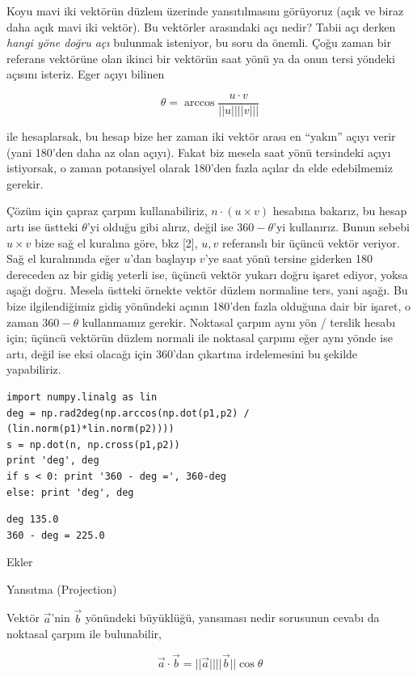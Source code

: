 \documentclass[12pt,fleqn]{article}\usepackage{../../common}
\begin{document}
Koyu mavi iki vektörün düzlem üzerinde yansıtılmasını görüyoruz (açık ve
biraz daha açık mavi iki vektör). Bu vektörler arasındaki açı nedir? Tabii
açı derken {\em hangi yöne doğru açı} bulunmak isteniyor, bu soru da
önemli. Çoğu zaman bir referans vektörüne olan ikinci bir vektörün saat
yönü ya da onun tersi yöndeki açısını isteriz. Eger açıyı bilinen

$$ \theta = \arccos \frac{u \cdot v}{||u||||v|||}$$

ile hesaplarsak, bu hesap bize her zaman iki vektör arası en ``yakın''
açıyı verir (yani 180'den daha az olan açıyı). Fakat biz mesela saat yönü
tersindeki açıyı istiyorsak, o zaman potansiyel olarak 180'den fazla açılar
da elde edebilmemiz gerekir.

Çözüm için çapraz çarpım kullanabiliriz, $n \cdot (u \times v)$ hesabına
bakarız, bu hesap artı ise üstteki $\theta$'yi olduğu gibi alırız, değil
ise $360-\theta$'yi kullanırız. Bunun sebebi $u \times v$ bize sağ el
kuralına göre, bkz [2], $u,v$ referanslı bir üçüncü vektör veriyor. Sağ el
kuralınında eğer $u$'dan başlayıp $v$'ye saat yönü tersine giderken 180
dereceden az bir gidiş yeterli ise, üçüncü vektör yukarı doğru işaret
ediyor, yoksa aşağı doğru. Mesela üstteki örnekte vektör düzlem normaline
ters, yani aşağı. Bu bize ilgilendiğimiz gidiş yönündeki açının 180'den
fazla olduğuna dair bir işaret, o zaman $360 - \theta$ kullanmamız
gerekir. Noktasal çarpım aynı yön / terslik hesabı için; üçüncü vektörün
düzlem normali ile noktasal çarpımı eğer aynı yönde ise artı, değil ise
eksi olacağı için 360'dan çıkartma irdelemesini bu şekilde yapabiliriz.

\begin{verbatim}
import numpy.linalg as lin
deg = np.rad2deg(np.arccos(np.dot(p1,p2) / (lin.norm(p1)*lin.norm(p2))))
s = np.dot(n, np.cross(p1,p2))
print 'deg', deg
if s < 0: print '360 - deg =', 360-deg
else: print 'deg', deg
\end{verbatim}

\begin{verbatim}
deg 135.0
360 - deg = 225.0
\end{verbatim}

Ekler

Yansıtma (Projection)

Vektör $\vec{a}$'nin $\vec{b}$ yönündeki büyüklüğü, yansıması nedir sorusunun
cevabı da noktasal çarpım ile bulunabilir, 

$$
\vec{a}\cdot\vec{b} = ||\vec{a}||||\vec{b}||\cos\theta
$$
\end{document}
